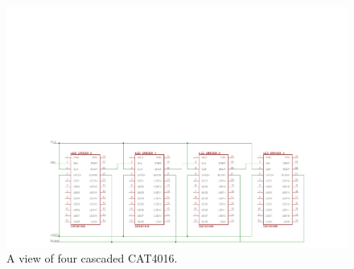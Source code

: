 \begin{figure}[H]
	\centering
	\includegraphics[width=\linewidth,trim={0 0 0 11.5cm},clip]{images/simpledriver}
	\caption{A view of four cascaded CAT4016.}
	\label{fig:simpledriver}
\end{figure}

